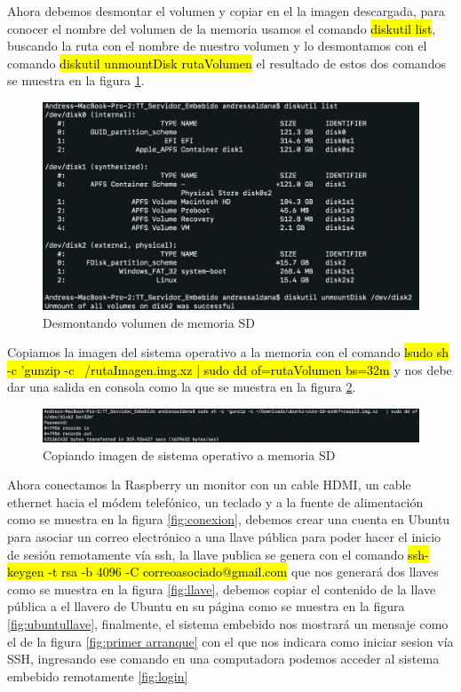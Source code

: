 Ahora debemos desmontar el volumen y copiar en el la imagen descargada, para conocer el nombre del volumen de la memoria usamos el comando \hl{diskutil list}, buscando la ruta con el nombre de nuestro volumen y lo desmontamos con el comando \hl{diskutil unmountDisk rutaVolumen} el resultado de estos dos comandos se muestra en la figura \ref{fig:desmonataje}.

\begin{figure}[H]
	\centering
	\includegraphics[scale=.4]{Capitulo5/images/unmount.png}
	\caption{Desmontando volumen de memoria SD}
	\label{fig:desmonataje}
\end{figure} 

Copiamos la imagen del sistema operativo a la memoria con el comando \hl{lsudo sh -c 'gunzip -c ~/rutaImagen.img.xz   | sudo dd of=rutaVolumen bs=32m} y nos debe dar una salida en consola como la que se muestra en la figura \ref{fig:copia}.

\begin{figure}[H]
	\centering
	\includegraphics[scale=.3]{Capitulo5/images/copyimg.png}
	\caption{Copiando imagen de sistema operativo a memoria SD}
	\label{fig:copia}
\end{figure} 


Ahora conectamos la Raspberry un monitor con un cable HDMI, un cable ethernet hacia el módem telefónico, un teclado y a la fuente de alimentación como se muestra en la figura \ref{fig:conexion}, debemos crear una cuenta en Ubuntu para asociar un correo electrónico a una llave pública para poder hacer el inicio de sesión remotamente vía ssh, la llave publica se genera con el comando \hl{ssh-keygen -t rsa -b 4096 -C correoasociado@gmail.com} que nos generará dos llaves como se muestra en la figura \ref{fig:llave}, debemos copiar el contenido de la llave pública a el llavero de Ubuntu en su página como se muestra en la figura \ref{fig:ubuntullave}, finalmente, el sistema embebido nos mostrará un mensaje como el de la figura \ref{fig:primer arranque} con el que nos indicara como iniciar sesion vía SSH, ingresando ese comando en una computadora podemos acceder al sistema embebido remotamente \ref{fig:login} 

